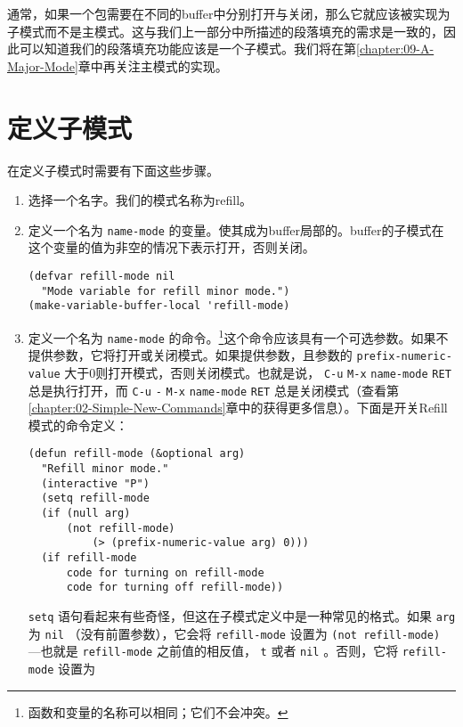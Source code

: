 通常，如果一个包需要在不同的buffer中分别打开与关闭，那么它就应该被实现为子模式而不是主模式。这与我们上一部分中所描述的段落填充的需求是一致的，因此可以知道我们的段落填充功能应该是一个子模式。我们将在第\ref{chapter:09-A-Major-Mode}章中再关注主模式的实现。

\section{定义子模式}
\label{section:07-Defining-a-Minor-Mode}

在定义子模式时需要有下面这些步骤。

\begin{enumerate}
  \item 选择一个名字。我们的模式名称为refill。
  \item 定义一个名为 \texttt{name-mode} 的变量。使其成为buffer局部的。buffer的子模式在这个变量的值为非空的情况下表示打开，否则关闭。
\begin{verbatim}
(defvar refill-mode nil
  "Mode variable for refill minor mode.")
(make-variable-buffer-local 'refill-mode)
\end{verbatim}
  \item 定义一个名为 \texttt{name-mode} 的命令。\footnote{函数和变量的名称可以相同；它们不会冲突。}这个命令应该具有一个可选参数。如果不提供参数，它将打开或关闭模式。如果提供参数，且参数的 \texttt{prefix-numeric-value} 大于0则打开模式，否则关闭模式。也就是说， \verb|C-u| \verb|M-x| \texttt{name-mode} \verb|RET| 总是执行打开，而 \verb|C-u| \verb|-| \verb|M-x| \texttt{name-mode} \verb|RET| 总是关闭模式（查看第\ref{chapter:02-Simple-New-Commands}章中的获得更多信息）。下面是开关Refill模式的命令定义：
\begin{verbatim}
(defun refill-mode (&optional arg)
  "Refill minor mode."
  (interactive "P")
  (setq refill-mode
  (if (null arg)
      (not refill-mode)
          (> (prefix-numeric-value arg) 0)))
  (if refill-mode
      code for turning on refill-mode
      code for turning off refill-mode))
\end{verbatim}
 \texttt{setq} 语句看起来有些奇怪，但这在子模式定义中是一种常见的格式。如果 \texttt{arg} 为 \texttt{nil} （没有前置参数），它会将 \texttt{refill-mode} 设置为 \texttt{(not refill-mode)} ---也就是 \texttt{refill-mode} 之前值的相反值， \texttt{t} 或者 \texttt{nil} 。否则，它将 \texttt{refill-mode} 设置为

\end{enumerate}
